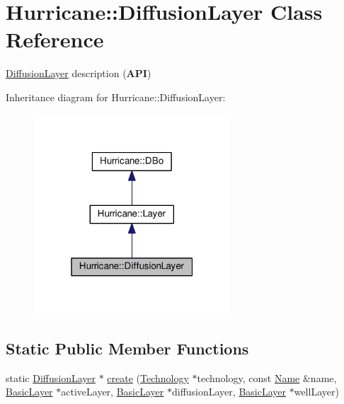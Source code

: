 \hypertarget{classHurricane_1_1DiffusionLayer}{}\section{Hurricane\+:\+:Diffusion\+Layer Class Reference}
\label{classHurricane_1_1DiffusionLayer}


\hyperlink{classHurricane_1_1DiffusionLayer}{Diffusion\+Layer} description ({\bfseries A\+PI})  




Inheritance diagram for Hurricane\+:\+:Diffusion\+Layer\+:\nopagebreak
\begin{figure}[H]
\begin{center}
\leavevmode
\includegraphics[width=208pt]{classHurricane_1_1DiffusionLayer__inherit__graph}
\end{center}
\end{figure}
\subsection*{Static Public Member Functions}
\begin{DoxyCompactItemize}
\item 
static \hyperlink{classHurricane_1_1DiffusionLayer}{Diffusion\+Layer} $\ast$ \hyperlink{classHurricane_1_1DiffusionLayer_a91b5f8a20b005c20b4b9b9080250939e}{create} (\hyperlink{classHurricane_1_1Technology}{Technology} $\ast$technology, const \hyperlink{classHurricane_1_1Name}{Name} \&name, \hyperlink{classHurricane_1_1BasicLayer}{Basic\+Layer} $\ast$active\+Layer, \hyperlink{classHurricane_1_1BasicLayer}{Basic\+Layer} $\ast$diffusion\+Layer, \hyperlink{classHurricane_1_1BasicLayer}{Basic\+Layer} $\ast$well\+Layer)
\end{DoxyCompactItemize}
